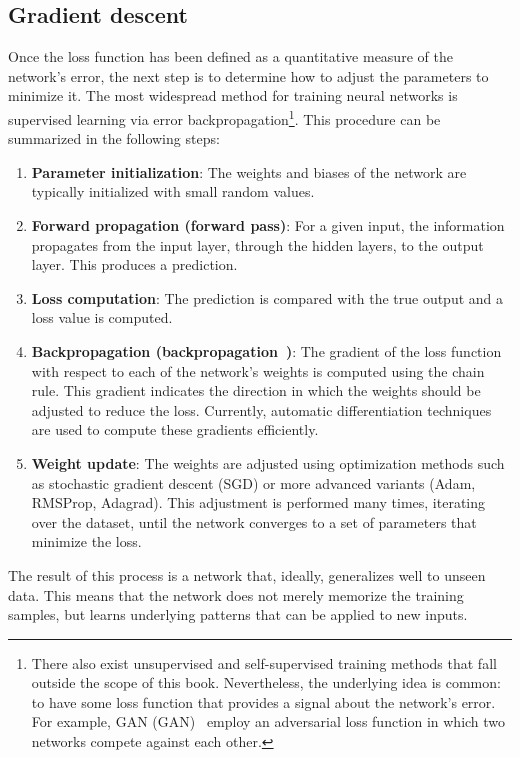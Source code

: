 \subsection{Gradient descent}\label{subsec:descenso_gradiente}

Once the loss function has been defined as a quantitative measure of the network's error, the next step is to determine how to adjust the parameters to minimize it. The most widespread method for training neural networks is supervised learning via error backpropagation\footnote{There also exist unsupervised and self-supervised training methods that fall outside the scope of this book. Nevertheless, the underlying idea is common: to have some loss function that provides a signal about the network's error. For example, \acrlong{GAN} (\gls{GAN})~\citep{goodfellow2014generative} employ an adversarial loss function in which two networks compete against each other.}. This procedure can be summarized in the following steps:

\begin{enumerate}
	\item \textbf{Parameter initialization}: The weights and biases of the network are typically initialized with small random values.
	\item \textbf{Forward propagation (forward pass)}: For a given input, the information propagates from the input layer, through the hidden layers, to the output layer. This produces a prediction.
	\item \textbf{Loss computation}: The prediction is compared with the true output and a loss value is computed.
	\item \textbf{Backpropagation (backpropagation~\citep{backpropagation})}: The gradient of the loss function with respect to each of the network's weights is computed using the chain rule. This gradient indicates the direction in which the weights should be adjusted to reduce the loss. Currently, automatic differentiation techniques~\citep{Neidinger2010IntroductionTA} are used to compute these gradients efficiently.
	\item \textbf{Weight update}: The weights are adjusted using optimization methods such as stochastic gradient descent (\gls{SGD}) or more advanced variants (\gls{Adam}, RMSProp, Adagrad). This adjustment is performed many times, iterating over the dataset, until the network converges to a set of parameters that minimize the loss.
\end{enumerate}

The result of this process is a network that, ideally, generalizes well to unseen data. This means that the network does not merely memorize the training samples, but learns underlying patterns that can be applied to new inputs.

